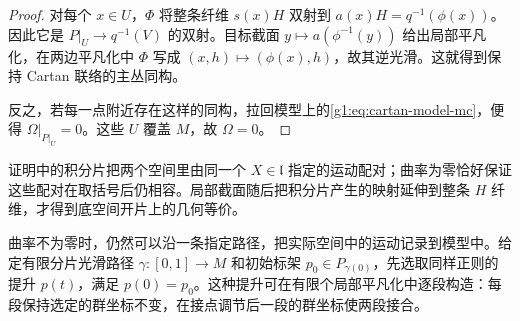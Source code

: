 \begin{proof}
	对每个 \(x\in U\)，\(\Phi\) 将整条纤维 \(s(x)H\) 双射到 \(a(x)H=q^{-1}(\phi(x))\)。因此它是 \(P|_U\to q^{-1}(V)\) 的双射。目标截面 \(y\mapsto a(\phi^{-1}(y))\) 给出局部平凡化，在两边平凡化中 \(\Phi\) 写成 \((x,h)\mapsto(\phi(x),h)\)，故其逆光滑。这就得到保持 Cartan 联络的主丛同构。

	反之，若每一点附近存在这样的同构，拉回模型上的\eqref{g1:eq:cartan-model-mc}，便得 \(\Omega|_{P|_U}=0\)。这些 \(U\) 覆盖 \(M\)，故 \(\Omega=0\)。
\end{proof}

证明中的积分片把两个空间里由同一个 \(X\in\mathfrak l\) 指定的运动配对；曲率为零恰好保证这些配对在取括号后仍相容。局部截面随后把积分片产生的映射延伸到整条 \(H\) 纤维，才得到底空间开片上的几何等价。

\ProseParagraphBreak

曲率不为零时，仍然可以沿一条指定路径，把实际空间中的运动记录到模型中。给定有限分片光滑路径 \(\gamma:[0,1]\to M\) 和初始标架 \(p_0\in P_{\gamma(0)}\)，先选取同样正则的提升 \(p(t)\)，满足 \(p(0)=p_0\)。这种提升可在有限个局部平凡化中逐段构造：每段保持选定的群坐标不变，在接点调节后一段的群坐标使两段接合。

